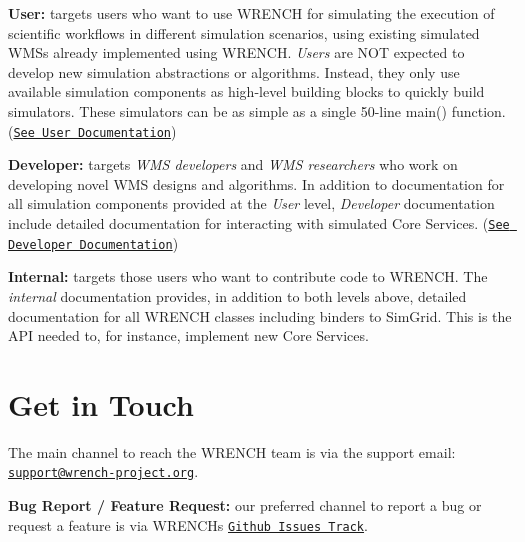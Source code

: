 {\bfseries User\+:} targets users who want to use W\+R\+E\+N\+CH for simulating the execution of scientific workflows in different simulation scenarios, using existing simulated W\+M\+Ss already implemented using W\+R\+E\+N\+CH. {\itshape Users} are N\+OT expected to develop new simulation abstractions or algorithms. Instead, they only use available simulation components as high-\/level building blocks to quickly build simulators. These simulators can be as simple as a single 50-\/line main() function. (\href{../user/index.html}{\tt See User Documentation})

{\bfseries Developer\+:} targets {\itshape W\+MS developers} and {\itshape W\+MS researchers} who work on developing novel W\+MS designs and algorithms. In addition to documentation for all simulation components provided at the {\itshape User} level, {\itshape Developer} documentation include detailed documentation for interacting with simulated Core Services. (\href{../developer/index.html}{\tt See Developer Documentation})

{\bfseries Internal\+:} targets those users who want to contribute code to W\+R\+E\+N\+CH. The {\itshape internal} documentation provides, in addition to both levels above, detailed documentation for all W\+R\+E\+N\+CH classes including binders to Sim\+Grid. This is the A\+PI needed to, for instance, implement new Core Services.\hypertarget{index_overview-contact}{}\section{Get in Touch}\label{index_overview-contact}
The main channel to reach the W\+R\+E\+N\+CH team is via the support email\+: \href{mailto:support@wrench-project.org?subject=WRENCH Support Contact: Your Topic}{\tt support@wrench-\/project.\+org}.

{\bfseries Bug Report / Feature Request\+:} our preferred channel to report a bug or request a feature is via W\+R\+E\+N\+CH\textquotesingle{}s \href{https://github.com/wrench-project/wrench/issues}{\tt Github Issues Track}. 